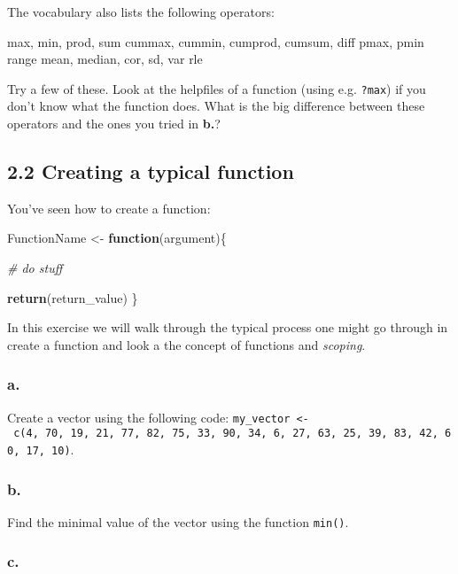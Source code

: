 \documentclass[]{article}
\newenvironment{Shaded}{\begin{snugshade}}{\end{snugshade}}
\newcommand{\CommentTok}[1]{\textcolor[rgb]{0.56,0.35,0.01}{\textit{#1}}}
\newcommand{\ControlFlowTok}[1]{\textcolor[rgb]{0.13,0.29,0.53}{\textbf{#1}}}
\newcommand{\KeywordTok}[1]{\textcolor[rgb]{0.13,0.29,0.53}{\textbf{#1}}}
\newcommand{\NormalTok}[1]{#1}
\newcommand{\StringTok}[1]{\textcolor[rgb]{0.31,0.60,0.02}{#1}}
\begin{document}
The vocabulary also lists the following operators:

max, min, prod, sum cummax, cummin, cumprod, cumsum, diff pmax, pmin
range mean, median, cor, sd, var rle

Try a few of these. Look at the helpfiles of a function (using e.g.
\texttt{?max}) if you don't know what the function does. What is the big
difference between these operators and the ones you tried in
\textbf{b.}?

\hypertarget{creating-a-typical-function}{%
\subsection{2.2 Creating a typical
function}\label{creating-a-typical-function}}

You've seen how to create a function:

\begin{Shaded}
\begin{Highlighting}[]
\NormalTok{FunctionName <-}\StringTok{ }\ControlFlowTok{function}\NormalTok{(argument)\{}
  
  \CommentTok{# do stuff }
  
  \KeywordTok{return}\NormalTok{(return_value)}
\NormalTok{\}}
\end{Highlighting}
\end{Shaded}

In this exercise we will walk through the typical process one might go
through in create a function and look a the concept of functions and
\emph{scoping}.

\hypertarget{a.-3}{%
\subsubsection{a.}\label{a.-3}}

Create a vector using the following code:
\texttt{my\_vector\ \textless{}-\ c(4,\ 70,\ 19,\ 21,\ 77,\ 82,\ 75,\ 33,\ 90,\ 34,\ 6,\ 27,\ 63,\ 25,\ 39,\ 83,\ 42,\ 60,\ 17,\ 10)}.

\hypertarget{b.-3}{%
\subsubsection{b.}\label{b.-3}}

Find the minimal value of the vector using the function \texttt{min()}.

\hypertarget{c.-3}{%
\subsubsection{c.}\label{c.-3}}
\end{document}
